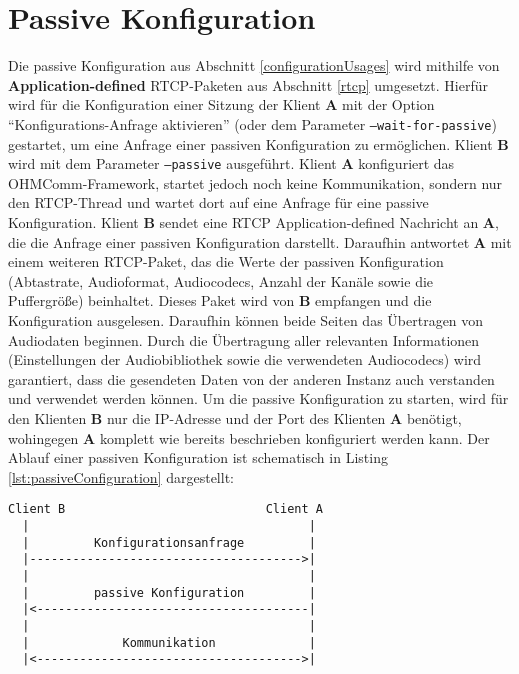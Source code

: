\section{Passive Konfiguration}
\label{passiveConfiguration}
Die passive Konfiguration aus Abschnitt \ref{configurationUsages} wird mithilfe von \textbf{Application-defined} RTCP-Paketen aus Abschnitt \ref{rtcp} umgesetzt. Hierfür wird für die Konfiguration einer Sitzung der Klient \textbf{A} mit der Option \enquote{Konfigurations-Anfrage aktivieren} (oder dem Parameter \texttt{--wait-for-passive}) gestartet, um eine Anfrage einer passiven Konfiguration zu ermöglichen. Klient \textbf{B} wird mit dem Parameter \texttt{--passive} ausgeführt. Klient \textbf{A} konfiguriert das OHMComm-Framework, startet jedoch noch keine Kommunikation, sondern nur den RTCP-Thread und wartet dort auf eine Anfrage für eine passive Konfiguration. Klient \textbf{B} sendet eine RTCP Application-defined Nachricht an \textbf{A}, die die Anfrage einer passiven Konfiguration darstellt. Daraufhin antwortet \textbf{A} mit einem weiteren RTCP-Paket, das die Werte der passiven Konfiguration (Abtastrate, Audioformat, Audiocodecs, Anzahl der Kanäle sowie die Puffergröße) beinhaltet. Dieses Paket wird von \textbf{B} empfangen und die Konfiguration ausgelesen. Daraufhin können beide Seiten das Übertragen von Audiodaten beginnen. Durch die Übertragung aller relevanten Informationen (Einstellungen der Audiobibliothek sowie die verwendeten Audiocodecs) wird garantiert, dass die gesendeten Daten von der anderen Instanz auch verstanden und verwendet werden können. Um die passive Konfiguration zu starten, wird für den Klienten \textbf{B} nur die IP-Adresse und der Port des Klienten \textbf{A} benötigt, wohingegen \textbf{A} komplett wie bereits beschrieben konfiguriert werden kann. Der Ablauf einer passiven Konfiguration ist schematisch in Listing \ref{lst:passiveConfiguration} dargestellt:
\begin{lstlisting}[keepspaces=true,numbers=none,label=lst:passiveConfiguration,caption=Ablauf der passiven Konfiguration,xleftmargin=.2\textwidth, xrightmargin=.2\textwidth]
Client B                            Client A
  |                                       |
  |         Konfigurationsanfrage         |
  |-------------------------------------->|
  |                                       |
  |         passive Konfiguration         |
  |<--------------------------------------|
  |                                       |
  |             Kommunikation             |
  |<------------------------------------->|
\end{lstlisting}